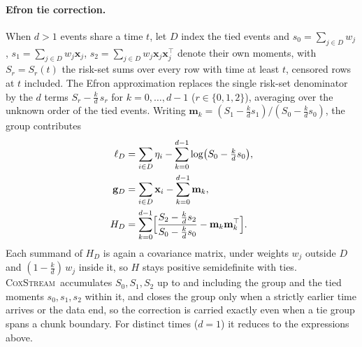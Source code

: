 \documentclass[11pt,a4paper]{article}
\newcommand{\coxstream}{\textsc{CoxStream}}
\begin{document}
\paragraph{Efron tie correction.} When $d > 1$ events share a time $t$, let $D$
index the tied events and $s_0 = \sum_{j \in D} w_j$,
$s_1 = \sum_{j \in D} w_j\mathbf{x}_j$,
$s_2 = \sum_{j \in D} w_j\mathbf{x}_j\mathbf{x}_j^\top$ denote their own
moments, with $S_r = S_r(t)$ the risk-set sums over every row with time at
least $t$, censored rows at $t$ included. The Efron approximation
\citep{efron1977efficiency} replaces the single risk-set denominator by the $d$
terms $S_r - \tfrac{k}{d}\,s_r$ for $k = 0,\dots,d-1$ ($r \in \{0,1,2\}$),
averaging over the unknown order of the tied events. Writing
$\mathbf{m}_k = (S_1 - \tfrac{k}{d}s_1)/(S_0 - \tfrac{k}{d}s_0)$, the group
contributes
\begin{align}
  \ell_D &= \sum_{i \in D} \eta_i
            - \sum_{k=0}^{d-1} \log\bigl(S_0 - \tfrac{k}{d}s_0\bigr), \\
  \mathbf{g}_D &= \sum_{i \in D} \mathbf{x}_i - \sum_{k=0}^{d-1} \mathbf{m}_k, \\
  H_D &= \sum_{k=0}^{d-1}
         \Bigl[\frac{S_2 - \tfrac{k}{d}s_2}{S_0 - \tfrac{k}{d}s_0}
               - \mathbf{m}_k\mathbf{m}_k^\top\Bigr].
\end{align}
Each summand of $H_D$ is again a covariance matrix, under weights $w_j$ outside
$D$ and $(1 - \tfrac{k}{d})\,w_j$ inside it, so $H$ stays positive
semidefinite with ties. \coxstream\ accumulates $S_0, S_1, S_2$ up to and
including the group and the tied moments $s_0, s_1, s_2$ within it, and closes
the group only when a strictly earlier time arrives or the data end, so the
correction is carried exactly even when a tie group spans a chunk boundary.
For distinct times ($d = 1$) it reduces to the expressions above.



\end{document}
